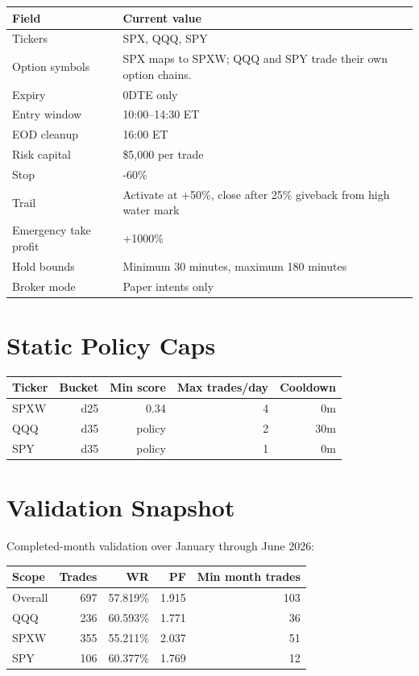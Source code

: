 \documentclass[11pt,a4paper]{article}
\begin{document}
\begin{center}
\begin{tabularx}{\textwidth}{lX}
\toprule
Field & Current value \\
\midrule
Tickers & SPX, QQQ, SPY \\
Option symbols & SPX maps to SPXW; QQQ and SPY trade their own option chains. \\
Expiry & 0DTE only \\
Entry window & 10:00--14:30 ET \\
EOD cleanup & 16:00 ET \\
Risk capital & \$5,000 per trade \\
Stop & -60\% \\
Trail & Activate at +50\%, close after 25\% giveback from high water mark \\
Emergency take profit & +1000\% \\
Hold bounds & Minimum 30 minutes, maximum 180 minutes \\
Broker mode & Paper intents only \\
\bottomrule
\end{tabularx}
\end{center}

\section{Static Policy Caps}

\begin{center}
\begin{tabular}{lrrrr}
\toprule
Ticker & Bucket & Min score & Max trades/day & Cooldown \\
\midrule
SPXW & d25 & 0.34 & 4 & 0m \\
QQQ & d35 & policy & 2 & 30m \\
SPY & d35 & policy & 1 & 0m \\
\bottomrule
\end{tabular}
\end{center}

\section{Validation Snapshot}

Completed-month validation over January through June 2026:

\begin{center}
\begin{tabular}{lrrrr}
\toprule
Scope & Trades & WR & PF & Min month trades \\
\midrule
Overall & 697 & 57.819\% & 1.915 & 103 \\
QQQ & 236 & 60.593\% & 1.771 & 36 \\
SPXW & 355 & 55.211\% & 2.037 & 51 \\
SPY & 106 & 60.377\% & 1.769 & 12 \\
\bottomrule
\end{tabular}
\end{center}
\end{document}
